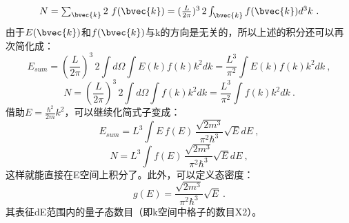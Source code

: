 \begin{equation}
N=\textstyle \sum_{\bvec{k}}2\ f(\bvec{k})=(\frac{L}{2\pi})^3\,2 \int_{\bvec{k}}f(\bvec{k})d^3k~.
\end{equation}
由于$E(\bvec{k})$和$f(\bvec{k})$与k的方向是无关的，所以上述的积分还可以再次简化成：
\begin{equation}
E_{sum}=(\frac{L}{2\pi})^3\,2\int d\Omega \int E(k)f(k)k^2dk=\frac{L^3}{\pi^2} \int E(k)f(k)k^2dk~,
\end{equation}
\begin{equation}
N=(\frac{L}{2\pi})^3\,2\int d\Omega \int f(k)k^2dk=\frac{L^3}{\pi^2}\int f(k)k^2dk~.
\end{equation}
借助$E=\frac{\hbar^2}{2m}k^2$，可以继续化简式子变成：
\begin{equation}
E_{sum}=L^3 \int E\,f(E)\,\frac{\sqrt{2m^3}}{\pi^2\hbar^3}\sqrt{E}dE~,
\end{equation}
\begin{equation}
N=L^3 \int f(E)\,\frac{\sqrt{2m^3}}{\pi^2\hbar^3}\sqrt{E}dE~,
\end{equation}
这样就能直接在E空间上积分了。此外，可以定义态密度：
\begin{equation}
g(E)=\frac{\sqrt{2m^3}}{\pi^2\hbar^3}\sqrt{E}~.
\end{equation}
其表征dE范围内的量子态数目（即k空间中格子的数目X2）。

